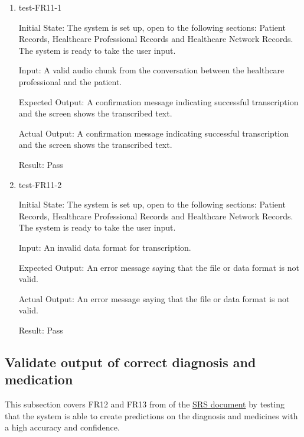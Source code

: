 \documentclass[12pt, titlepage]{article}
\begin{document}
\begin{enumerate}

  \item{test-FR11-1} \label{test-FR11-1}
  
  Initial State: The system is set up, open to the following sections: Patient Records, Healthcare Professional Records and Healthcare Network Records. The system is ready to take the user input.

  Input: A valid audio chunk from the conversation between the healthcare professional and the patient.

  Expected Output: A confirmation message indicating successful transcription and the screen shows the transcribed text.

  Actual Output: A confirmation message indicating successful transcription and the screen shows the transcribed text.

  Result: Pass


  \item{test-FR11-2} \label{test-FR11-2}

  Initial State: The system is set up, open to the following sections: Patient Records, Healthcare Professional Records and Healthcare Network Records. The system is ready to take the user input.

  Input: An invalid data format for transcription.

  Expected Output: An error message saying that the file or data format is not valid.

  Actual Output: An error message saying that the file or data format is not valid.

  Result: Pass

\end{enumerate}

\subsection{Validate output of correct diagnosis and medication} \label{section:3.6}

This subsection covers FR12 and FR13 from of the \href{https://github.com/Inreet-Kaur/capstone/blob/main/docs/SRS/SRS.pdf} {SRS document} by testing that the system is able to create predictions on the diagnosis and medicines with a high accuracy and confidence.
\end{document}
